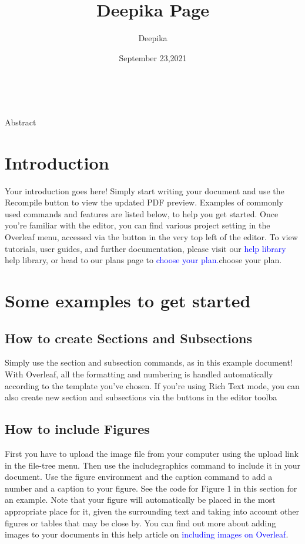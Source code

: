 \documentclass{article}
\title{Deepika Page}
\author{Deepika}
\date{September 23,2021}
\begin{document}
   \maketitle\
   
   \subitem Abstract
   \section{Introduction}
   
   Your introduction goes here! Simply start writing your document and use the Recompile button to
   view the updated PDF preview. Examples of commonly used commands and features are listed below,
   to help you get started.
   Once you’re familiar with the editor, you can find various project setting in the Overleaf menu,
   accessed via the button in the very top left of the editor. To view tutorials, user guides, and further
   documentation, please visit our
   \textcolor{blue}{help library} help library, or head to our plans page to \textcolor{blue}{choose your plan.}choose your plan.
   
   \section{Some examples to get started}
   \subsection{How to create Sections and Subsections}
    Simply use the section and subsection commands, as in this example document! With Overleaf, all
    the formatting and numbering is handled automatically according to the template you’ve chosen. If
    you’re using Rich Text mode, you can also create new section and subsections via the buttons in the
    editor toolba
    
    \subsection{How to include Figures}
    First you have to upload the image file from your computer using the upload link in the file-tree menu.
    Then use the includegraphics command to include it in your document. Use the figure environment
    and the caption command to add a number and a caption to your figure. See the code for Figure 1 in
    this section for an example.
    Note that your figure will automatically be placed in the most appropriate place for it, given the
    surrounding text and taking into account other figures or tables that may be close by. You can find
    out more about adding images to your documents in this help article on \textcolor{blue}{ including images on Overleaf}.
    
\end{document}
